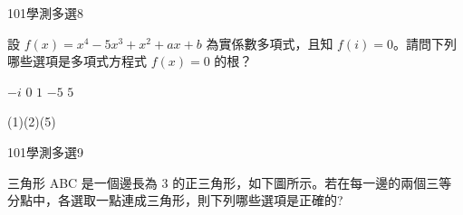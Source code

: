 \begin{QUESTIONS}
    \begin{QUESTION}
        \begin{ExamInfo}{101}{學測}{多選}{8}
        \end{ExamInfo}
        \begin{ExamAnsRateInfo}{56}{92}{58}{18}
        \end{ExamAnsRateInfo}
        \begin{QBODY}
            設 $f(x) = x^4-5x^3+x^2+ax+b$ 為實係數多項式，且知 $f( i)  =0 $。請問下列哪些選項是多項式方程式 $f (x ) = 0$ 的根？
		\begin{QOPS} 
			\QOP  $-i$ 
			\QOP  $0$
			\QOP  $1$ 
			\QOP  $-5$ 
			\QOP  $5$
		\end{QOPS}
        \end{QBODY}
        \begin{QFROMS}
        \end{QFROMS}
        \begin{QTAGS}\end{QTAGS}
        \begin{QANS}
            (1)(2)(5)
        \end{QANS}
        \begin{QSOLLIST}
        \end{QSOLLIST}
        \begin{QEMPTYSPACE}
        \end{QEMPTYSPACE}
    \end{QUESTION}
    \begin{QUESTION}
        \begin{ExamInfo}{101}{學測}{多選}{9}
        \end{ExamInfo}
        \begin{ExamAnsRateInfo}{51}{77}{51}{25}
        \end{ExamAnsRateInfo}
        \begin{QBODY}
            三角形 ABC 是一個邊長為 3 的正三角形，如下圖所示。若在每一邊的兩個三等分點中，各選取一點連成三角形，則下列哪些選項是正確的?


\end{QBODY}
\end{QUESTION}
\end{QUESTIONS}
